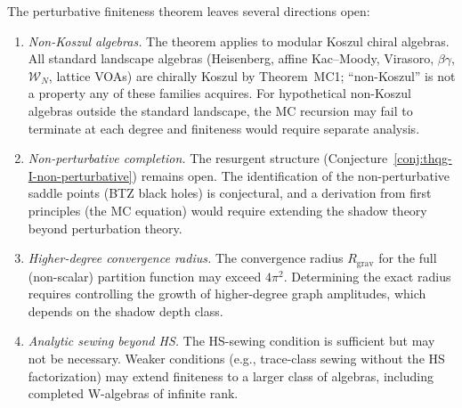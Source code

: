 \begin{remark}
\label{rem:thqg-I-open-directions}
The perturbative finiteness theorem leaves several directions open:
\begin{enumerate}[label=\textup{(\arabic*)}]
\item \emph{Non-Koszul algebras.} The theorem applies to modular Koszul chiral algebras. All standard landscape algebras (Heisenberg, affine Kac--Moody, Virasoro, $\beta\gamma$, $\mathcal{W}_N$, lattice VOAs) are chirally Koszul by Theorem~MC1; ``non-Koszul'' is not a property any of these families acquires. For hypothetical non-Koszul algebras outside the standard landscape, the MC recursion may fail to terminate at each degree and finiteness would require separate analysis.
\item \emph{Non-perturbative completion.} The resurgent structure (Conjecture~\ref{conj:thqg-I-non-perturbative}) remains open. The identification of the non-perturbative saddle points (BTZ black holes) is conjectural, and a derivation from first principles (the MC equation) would require extending the shadow theory beyond perturbation theory.
\item \emph{Higher-degree convergence radius.} The convergence radius $R_{\mathrm{grav}}$ for the full (non-scalar) partition function may exceed $4\pi^2$. Determining the exact radius requires controlling the growth of higher-degree graph amplitudes, which depends on the shadow depth class.
\item \emph{Analytic sewing beyond HS.} The HS-sewing condition is sufficient but may not be necessary. Weaker conditions (e.g., trace-class sewing without the HS factorization) may extend finiteness to a larger class of algebras, including completed W-algebras of infinite rank.
\end{enumerate}
\end{remark}
